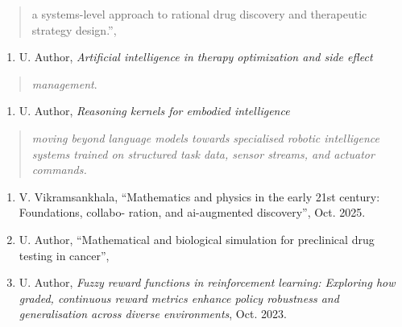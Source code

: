 \documentclass[
]{article}
\begin{document}
\begin{quote}
a systems-level approach to rational drug discovery and therapeutic
strategy design.'',
\end{quote}

\begin{enumerate}
\def\labelenumi{\arabic{enumi}.}
\setcounter{enumi}{17}
\item
  \protect\hypertarget{_bookmark58}{}{}U. Author, \emph{Artificial
  intelligence in therapy optimization and side eflect}
\end{enumerate}

\begin{quote}
\emph{management}.
\end{quote}

\begin{enumerate}
\def\labelenumi{\arabic{enumi}.}
\setcounter{enumi}{18}
\item
  \protect\hypertarget{_bookmark59}{}{}U. Author, \emph{Reasoning
  kernels for embodied intelligence}
\end{enumerate}

\begin{quote}
\emph{moving beyond language models towards specialised robotic
intelligence systems trained on structured task data, sensor streams,
and actuator commands.}
\end{quote}

\begin{enumerate}
\def\labelenumi{\arabic{enumi}.}
\setcounter{enumi}{19}
\item
  \protect\hypertarget{_bookmark60}{}{}V. Vikramsankhala, ``Mathematics
  and physics in the early 21st century: Foundations, collabo- ration,
  and ai-augmented discovery'', Oct. 2025.
\item
  \protect\hypertarget{_bookmark61}{}{}U. Author, ``Mathematical and
  biological simulation for preclinical drug testing in cancer'',
\item
  \protect\hypertarget{_bookmark62}{}{}U. Author, \emph{Fuzzy reward
  functions in reinforcement learning: Exploring how graded, continuous
  reward metrics enhance policy robustness and generalisation across
  diverse environments}, Oct. 2023.
\end{enumerate}
\end{document}
